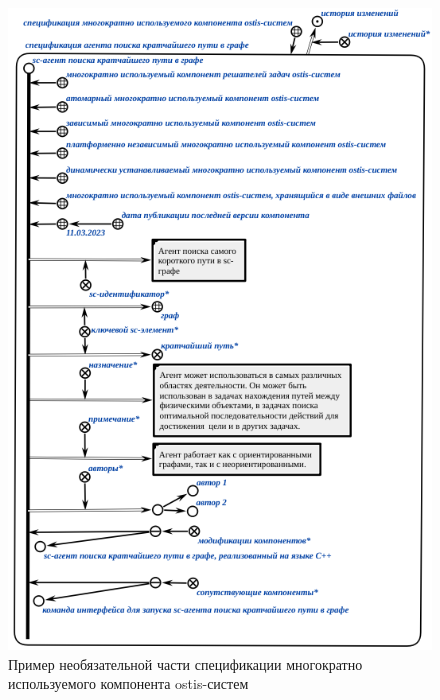 \begin{figure}[H]
	\includegraphics[scale=1.0]{author/part5/figures/component_optional_specification_example.png}
	\caption{Пример необязательной части спецификации многократно используемого компонента ostis-систем}
	\label{fig:component_optional_specification_example}
\end{figure}

